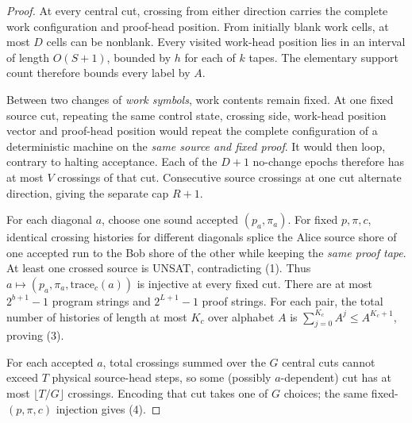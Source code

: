 \documentclass[11pt]{article}
\begin{document}
\begin{proof}
At every central cut, crossing from either direction carries the
complete work configuration and proof-head position.
From initially blank work cells, at most $D$ cells can be
nonblank. Every visited work-head position lies in an interval
of length $O(S+1)$, bounded by $h$ for each of $k$ tapes.
The elementary support count therefore bounds every label by $A$.

Between two changes of \emph{work symbols}, work contents remain fixed.
At one fixed source cut, repeating the same control state,
crossing side, work-head position vector and proof-head position
would repeat the complete configuration of a deterministic machine
on the \emph{same source and fixed proof}. It would then loop,
contrary to halting acceptance. Each of the $D+1$ no-change epochs
therefore has at most $V$ crossings of that cut.
Consecutive source crossings at one cut alternate direction,
giving the separate cap $R+1$.

For each diagonal $a$, choose one sound accepted $(p_a,\pi_a)$.
For fixed $p,\pi,c$, identical crossing histories for different
diagonals splice the Alice source shore of one accepted run to the
Bob shore of the other while keeping the \emph{same proof tape}.
At least one crossed source is UNSAT, contradicting (1).
Thus $a\mapsto(p_a,\pi_a,\mathrm{trace}_c(a))$ is injective at every
fixed cut. There are at most $2^{b+1}-1$ program strings and
$2^{L+1}-1$ proof strings. For each pair, the total number
of histories of length at most $K_c$ over alphabet $A$ is
$\sum_{j=0}^{K_c}A^j\le A^{K_c+1}$, proving (3).

For each accepted $a$, total crossings summed over the $G$
central cuts cannot exceed $T$ physical source-head steps, so
some (possibly $a$-dependent) cut has at most
$\lfloor T/G\rfloor$ crossings. Encoding that cut takes one of
$G$ choices; the same fixed-$(p,\pi,c)$ injection gives (4).
\end{proof}
\end{document}
